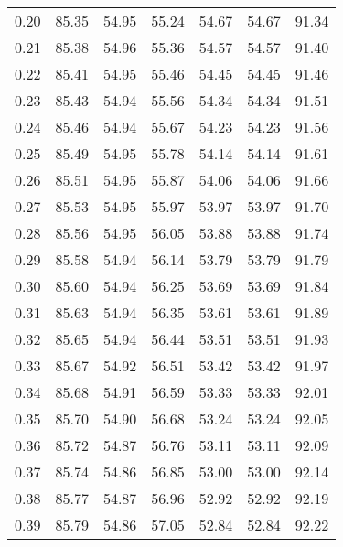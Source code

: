 \begin{tabular}{|c|c|c|c|c|c|c|}
      0.20 &     85.35 &     54.95 &      55.24 &   54.67 &      54.67 &         91.34 \\
      0.21 &     85.38 &     54.96 &      55.36 &   54.57 &      54.57 &         91.40 \\
      0.22 &     85.41 &     54.95 &      55.46 &   54.45 &      54.45 &         91.46 \\
      0.23 &     85.43 &     54.94 &      55.56 &   54.34 &      54.34 &         91.51 \\
      0.24 &     85.46 &     54.94 &      55.67 &   54.23 &      54.23 &         91.56 \\
      0.25 &     85.49 &     54.95 &      55.78 &   54.14 &      54.14 &         91.61 \\
      0.26 &     85.51 &     54.95 &      55.87 &   54.06 &      54.06 &         91.66 \\
      0.27 &     85.53 &     54.95 &      55.97 &   53.97 &      53.97 &         91.70 \\
      0.28 &     85.56 &     54.95 &      56.05 &   53.88 &      53.88 &         91.74 \\
      0.29 &     85.58 &     54.94 &      56.14 &   53.79 &      53.79 &         91.79 \\
      0.30 &     85.60 &     54.94 &      56.25 &   53.69 &      53.69 &         91.84 \\
      0.31 &     85.63 &     54.94 &      56.35 &   53.61 &      53.61 &         91.89 \\
      0.32 &     85.65 &     54.94 &      56.44 &   53.51 &      53.51 &         91.93 \\
      0.33 &     85.67 &     54.92 &      56.51 &   53.42 &      53.42 &         91.97 \\
      0.34 &     85.68 &     54.91 &      56.59 &   53.33 &      53.33 &         92.01 \\
      0.35 &     85.70 &     54.90 &      56.68 &   53.24 &      53.24 &         92.05 \\
      0.36 &     85.72 &     54.87 &      56.76 &   53.11 &      53.11 &         92.09 \\
      0.37 &     85.74 &     54.86 &      56.85 &   53.00 &      53.00 &         92.14 \\
      0.38 &     85.77 &     54.87 &      56.96 &   52.92 &      52.92 &         92.19 \\
      0.39 &     85.79 &     54.86 &      57.05 &   52.84 &      52.84 &         92.22 \\

\end{tabular}
